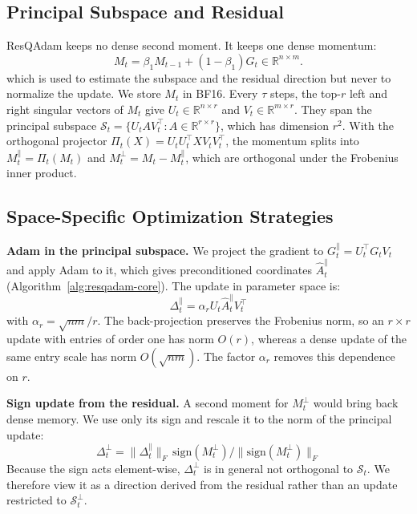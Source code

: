 \documentclass{article} %
\begin{document}
\subsection{Principal Subspace and Residual}
\label{sec:core_residual}
ResQAdam keeps no dense second moment. 
It keeps one dense momentum:
\begin{equation}
M_t = \beta_1 M_{t-1} + (1-\beta_1)G_t \in \mathbb{R}^{n \times m}.
\end{equation}
which is used to estimate the subspace and the residual direction but never to normalize the update. We store $M_t$ in BF16. 
Every $\tau$ steps, the top-$r$ left and right singular vectors of $M_t$ give $U_t\in\mathbb{R}^{n\times r}$ and $V_t\in\mathbb{R}^{m\times r}$. 
They span the principal subspace $\mathcal{S}_t=\{U_tAV_t^\top : A\in\mathbb{R}^{r\times r}\}$, which has dimension $r^2$. 
With the orthogonal projector $\Pi_t(X)=U_tU_t^\top XV_tV_t^\top$, the momentum splits into $M_t^{\parallel}=\Pi_t(M_t)$ and $M_t^{\perp}=M_t-M_t^{\parallel}$, which are orthogonal under the Frobenius inner product.



\subsection{Space-Specific Optimization Strategies}
\label{sec:subspace_opt}
\textbf{Adam in the principal subspace.} We project the gradient to $G_t^{\parallel}=U_t^\top G_tV_t$ and apply Adam to it, which gives preconditioned coordinates $\hat A_t^{\parallel}$ (Algorithm~\ref{alg:resqadam-core}). The update in parameter space is:
\begin{equation}
\Delta_t^{\parallel}=\alpha_r U_t\hat A_t^{\parallel}V_t^\top
\end{equation}
with $\alpha_r=\sqrt{nm}/r$. The back-projection preserves the Frobenius norm, so an $r\times r$ update with entries of order one has norm $O(r)$, whereas a dense update of the same entry scale has norm $O(\sqrt{nm})$. The factor $\alpha_r$ removes this dependence on $r$.

\textbf{Sign update from the residual.} A second moment for $M_t^{\perp}$ would bring back dense memory. We use only its sign and rescale it to the norm of the principal update:
\begin{equation}
\Delta_t^{\perp}=\|\Delta_t^{\parallel}\|_F\,\mathrm{sign}(M_t^{\perp})/\|\mathrm{sign}(M_t^{\perp})\|_F
\end{equation}
Because the sign acts element-wise, $\Delta_t^{\perp}$ is in general not orthogonal to $\mathcal{S}_t$. We therefore view it as a direction derived from the residual rather than an update restricted to $\mathcal{S}_t^{\perp}$.
\end{document}
